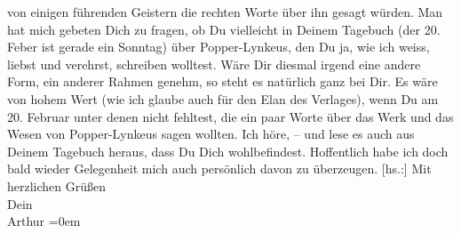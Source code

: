 \begin{ledgroupsized}[t]{13cm}
               von einigen führenden Geistern die rechten Worte über ihn gesagt würden. Man hat mich
               gebeten Dich zu fragen, ob Du vielleicht in Deinem Tagebuch (der 20.
                  Feber ist gerade ein Sonntag) über Popper-Lynkeus, den Du ja, wie ich weiss, liebst und verehrst, schreiben
               wolltest. Wäre Dir diesmal irgend eine andere Form, ein anderer Rahmen genehm, so
               steht es natürlich ganz bei Dir. Es wäre von hohem Wert (wie ich glaube auch für den
               Elan des Verlages), wenn Du am 20. Februar unter denen nicht fehltest,
               die ein paar Worte über das Werk und das Wesen von Popper-Lynkeus sagen wollten.\pend
           \pstart
           Ich höre\introOben{}, –\introOben{} und lese es auch aus Deinem Tagebuch heraus, dass Du Dich wohlbefindest. Hoffentlich habe ich
               doch bald wieder Gelegenheit mich auch persönlich davon zu überzeugen.\pend
           \pstart
           {[}hs.:{]} Mit herzlichen Grüßen{\\[\baselineskip]}Dein{\\[\baselineskip]}\spacefill\mbox{Arthur}\pend
           \leftskip=0em{}
         
         \endnumbering{}\end{ledgroupsized}  \newcommand{\dateiname}{L02360}\newcommand{\titel}{Arthur Schnitzler an Hermann Bahr, 7. 2. 1921}\newcommand{\editorInnen}{ Kurt Ifkovits,  Martin Anton Müller}
      